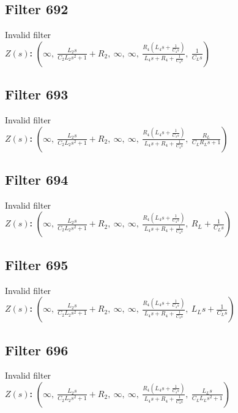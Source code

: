 \documentclass{article}
\begin{document}
\subsection*{Filter 692}
Invalid filter \\ 
\textbf{$Z(s)$:} $\left( \infty, \  \frac{L_{2} s}{C_{2} L_{2} s^{2} + 1} + R_{2}, \  \infty, \  \infty, \  \frac{R_{4} \left(L_{4} s + \frac{1}{C_{4} s}\right)}{L_{4} s + R_{4} + \frac{1}{C_{4} s}}, \  \frac{1}{C_{L} s}\right)$ \\ 
\subsection*{Filter 693}
Invalid filter \\ 
\textbf{$Z(s)$:} $\left( \infty, \  \frac{L_{2} s}{C_{2} L_{2} s^{2} + 1} + R_{2}, \  \infty, \  \infty, \  \frac{R_{4} \left(L_{4} s + \frac{1}{C_{4} s}\right)}{L_{4} s + R_{4} + \frac{1}{C_{4} s}}, \  \frac{R_{L}}{C_{L} R_{L} s + 1}\right)$ \\ 
\subsection*{Filter 694}
Invalid filter \\ 
\textbf{$Z(s)$:} $\left( \infty, \  \frac{L_{2} s}{C_{2} L_{2} s^{2} + 1} + R_{2}, \  \infty, \  \infty, \  \frac{R_{4} \left(L_{4} s + \frac{1}{C_{4} s}\right)}{L_{4} s + R_{4} + \frac{1}{C_{4} s}}, \  R_{L} + \frac{1}{C_{L} s}\right)$ \\ 
\subsection*{Filter 695}
Invalid filter \\ 
\textbf{$Z(s)$:} $\left( \infty, \  \frac{L_{2} s}{C_{2} L_{2} s^{2} + 1} + R_{2}, \  \infty, \  \infty, \  \frac{R_{4} \left(L_{4} s + \frac{1}{C_{4} s}\right)}{L_{4} s + R_{4} + \frac{1}{C_{4} s}}, \  L_{L} s + \frac{1}{C_{L} s}\right)$ \\ 
\subsection*{Filter 696}
Invalid filter \\ 
\textbf{$Z(s)$:} $\left( \infty, \  \frac{L_{2} s}{C_{2} L_{2} s^{2} + 1} + R_{2}, \  \infty, \  \infty, \  \frac{R_{4} \left(L_{4} s + \frac{1}{C_{4} s}\right)}{L_{4} s + R_{4} + \frac{1}{C_{4} s}}, \  \frac{L_{L} s}{C_{L} L_{L} s^{2} + 1}\right)$ \\ 
\end{document}
